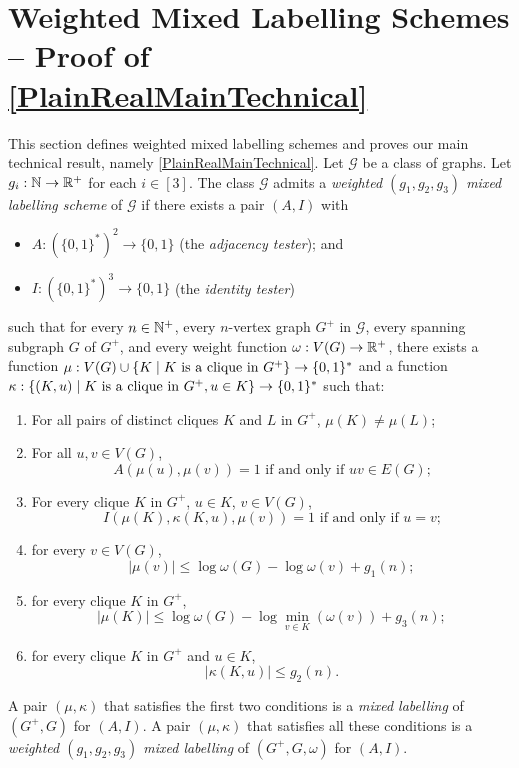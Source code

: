 \documentclass{patmorin}
\renewcommand{\le}{\leqslant}
\renewcommand{\leq}{\leqslant}
\newcommand{\defin}[1]{\emph{\textcolor{brightmaroon}{#1}}}
\DeclarePairedDelimiter{\set}{\{}{\}}
\newcommand{\calG}{\mathcal{G}}
\begin{document}
\section{Weighted Mixed Labelling Schemes -- Proof of \texorpdfstring{\cref{PlainRealMainTechnical}}{Theorem \ref*{PlainRealMainTechnical}}}
\label{weighted_mixed_section}
 
This section defines weighted mixed labelling schemes and proves our main technical result, namely \cref{PlainRealMainTechnical}. Let $\calG$ be a class of graphs.
Let $g_i:\mathbb{N}\to\mathbb{R}^+$ for each $i\in[3]$.
The class  $\calG$ admits a \defin{weighted $(g_1,g_2,g_3)$ mixed labelling scheme} of $\calG$ if there exists a pair $(A,I)$ with
\begin{itemize}[nosep,nolistsep]
  \item $A:(\{0,1\}^*)^2\to\{0,1\}$ (the \defin{adjacency tester}); and
  \item $I:(\{0,1\}^*)^3\to\{0,1\}$ (the \defin{identity tester})
\end{itemize}
such that for every $n\in\mathbb{N}^+$, every $n$-vertex graph $G^+$ in $\calG$, every spanning subgraph $G$ of $G^+$, and every weight function $\omega:V(G)\to \mathbb{R}^+$, there exists a function $\mu: V(G)\cup \{K\mid \text{$K$ is a clique in $G^+$}\} \to \set{0,1}^*$ and a function $\kappa:\{(K, u)\mid \text{$K$ is a clique in $G^+$}, u\in K\}\to \set{0,1}^*$ such that:
\begin{enumerate}[nosep,nolistsep,label=(\roman*)]
  \item For all pairs of distinct cliques $K$ and $L$ in $G^+$, $\mu(K)\neq\mu(L)$;
  \item For all $u,v\in V(G)$,
        \[
          \textrm{$A(\mu(u),\mu(v))=1$ if and only if $uv\in E(G)$;}
        \]
  \item For every clique $K$ in $G^+$, $u\in K$, $v\in V(G)$,
        \[
          \textrm{$I(\mu(K),\kappa(K, u),\mu(v))=1$ if and only if $u=v$;}
        \]
  \item for every $v\in V(G)$,
        \[
          |\mu(v)| \leq \log \omega(G) - \log\omega(v) + g_1(n);
        \]
  \item for every clique $K$ in $G^+$,
        \[
          |\mu(K)|\le \log \omega(G) - \log\min_{v\in K}(\omega(v)) + g_3(n);
        \]
  \item  for every clique $K$ in $G^+$ and $u\in K$,
        \[
          |\kappa(K, u)| \leq g_2(n).
        \]
\end{enumerate}
A pair $(\mu,\kappa)$ that satisfies the first two conditions is a \defin{mixed labelling} of $(G^+,G)$ for $(A,I)$.  A pair $(\mu,\kappa)$ that satisfies all these conditions is a \defin{weighted $(g_1,g_2,g_3)$ mixed labelling} of $(G^+,G,\omega)$ for $(A,I)$.
\end{document}
